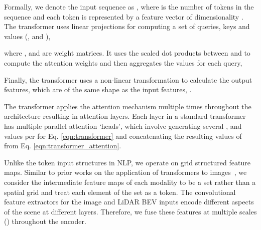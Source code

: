 \documentclass[final]{cvpr}
\begin{document}
Formally, we denote the input sequence as , where  is the number of tokens in the sequence and each token is represented by a feature vector of dimensionality . The transformer uses linear projections for computing a set of queries, keys and values (,  and ),

where ,  and  are weight matrices. It uses the scaled dot products between  and  to compute the attention weights and then aggregates the values for each query,

Finally, the transformer uses a non-linear transformation to calculate the output features,  which are of the same shape as the input features, .

The transformer applies the attention mechanism multiple times throughout the architecture resulting in  attention layers. Each layer in a standard transformer has multiple parallel attention `heads', which involve generating several ,  and  values per  for Eq. \eqref{eqn:transformer} and concatenating the resulting values of  from Eq. \eqref{eqn:transformer_attention}.

Unlike the token input structures in NLP, we operate on grid structured feature maps. Similar to prior works on the application of transformers to images~\cite{Sun2019ICCV,Chen2020ICML,Qi2020ARXIV,Dosovitskiy2020ARXIV}, we consider the intermediate feature maps of each modality to be a set rather than a spatial grid and treat each element of the set as a token. The convolutional feature extractors for the image and LiDAR BEV inputs encode different aspects of the scene at different layers. Therefore, we fuse these features at multiple scales () throughout the encoder.
\end{document}
